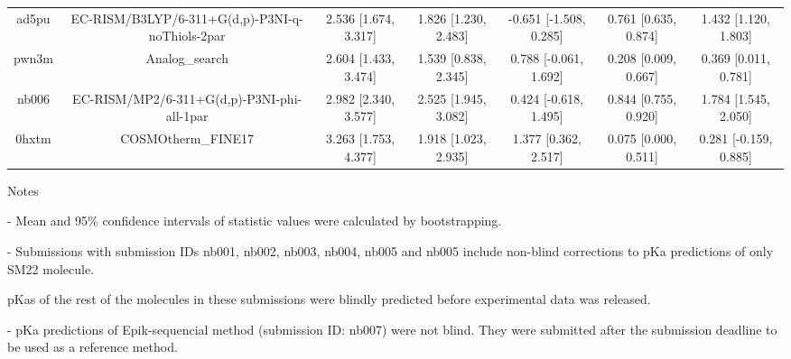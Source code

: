 \documentclass{article}
\begin{document}
\begin{center}
\begin{longtable}{|ccccccc|}
 ad5pu &    EC-RISM/B3LYP/6-311+G(d,p)-P3NI-q-noThiols-2par &  2.536 [1.674, 3.317] &  1.826 [1.230, 2.483] &   -0.651 [-1.508, 0.285] &  0.761 [0.635, 0.874] &   1.432 [1.120, 1.803] \\
 pwn3m &                                     Analog\_search &  2.604 [1.433, 3.474] &  1.539 [0.838, 2.345] &    0.788 [-0.061, 1.692] &  0.208 [0.009, 0.667] &   0.369 [0.011, 0.781] \\
 nb006 &         EC-RISM/MP2/6-311+G(d,p)-P3NI-phi-all-1par &  2.982 [2.340, 3.577] &  2.525 [1.945, 3.082] &    0.424 [-0.618, 1.495] &  0.844 [0.755, 0.920] &   1.784 [1.545, 2.050] \\
 0hxtm &                                 COSMOtherm\_FINE17 &  3.263 [1.753, 4.377] &  1.918 [1.023, 2.935] &     1.377 [0.362, 2.517] &  0.075 [0.000, 0.511] &  0.281 [-0.159, 0.885] \\
\end{longtable}
\end{center}

Notes

- Mean and 95\% confidence intervals of statistic values were calculated by bootstrapping.

- Submissions with submission IDs nb001, nb002, nb003, nb004, nb005 and nb005 include non-blind corrections to pKa predictions of only SM22 molecule.

pKas of the rest of the molecules in these submissions were blindly predicted before experimental data was released.

- pKa predictions of Epik-sequencial method (submission ID: nb007) were not blind. They were submitted after the submission deadline to be used as a reference method.
\end{document}
